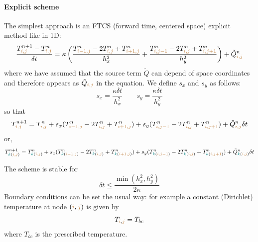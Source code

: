 \paragraph{Explicit scheme} The simplest approach is an {\color{olive} FTCS} 
(forward time, centered space) explicit method like in 1D:
\begin{equation}
\frac{T_{{\color{brown}i,j}}^{n+1}-T_{{\color{brown}i,j}}^n}{\delta t}
= \kappa
\left(
\frac{ T_{{\color{brown}i-1,j}}^{n}-2T_{{\color{brown}i,j}}^{n}+T_{{\color{brown}i+1,j}}^{n}  }{h_x^2} + 
\frac{ T_{{\color{brown}i,j-1}}^{n}-2T_{{\color{brown}i,j}}^{n}+T_{{\color{brown}i,j+1}}^{n}  }{h_y^2}
\right)
+\tilde{Q}_{{\color{brown}i,j}}^n
\end{equation}
where we have assumed that the source term $\tilde{Q}$ 
can depend of space coordinates and therefore 
appears as $\tilde{Q}_{{\color{brown}i,j}}$ in the equation.
We define $s_x$ and $s_y$ as follows:
\begin{equation}
s_x = \frac{\kappa \delta t}{h_x^2}
\quad\quad
s_y = \frac{\kappa \delta t}{h_y^2}
\end{equation}
so that
\begin{equation}
T_{{\color{brown}i,j}}^{n+1} = T_{{\color{brown}i,j}}^n 
+ s_x ( T_{{\color{brown}i-1,j}}^{n}
-2T_{{\color{brown}i,j}}^{n}
+T_{{\color{brown}i+1,j}}^{n} ) 
+s_y ( T_{{\color{brown}i,j-1}}^{n}
-2T_{{\color{brown}i,j}}^{n}
+T_{{\color{brown}i,j+1}}^{n} ) + 
\tilde{Q}_{{\color{brown}i,j}}^n \delta t
\end{equation}
or, 
\begin{equation}
T_{{\color{teal}k}({\color{brown}i,j})}^{n+1} = 
T_{{\color{teal}k}({\color{brown}i,j})}^n 
+ s_x ( T_{{\color{teal}k}({\color{brown}i-1,j})}^{n}
-2T_{{\color{teal}k}({\color{brown}i,j})}^{n}
+T_{{\color{teal}k}({\color{brown}i+1,j})}^{n} ) 
+s_y ( T_{{\color{teal}k}({\color{brown}i,j-1})}^{n}
-2T_{{\color{teal}k}({\color{brown}i,j})}^{n}
+T_{{\color{teal}k}({\color{brown}i,j+1})}^{n} ) + 
\tilde{Q}_{{\color{teal}k}({\color{brown}i,j})}^n \delta t
\end{equation}



The scheme is stable for  
\begin{equation}
\delta t \leq \frac{\min(h_x^2,h_y^2)}{2 \kappa}
\end{equation}
Boundary conditions can be set the usual way: for example a constant (Dirichlet) temperature 
at node $({\color{brown}i},{\color{brown}j})$ is given by
\begin{equation}
T_{{\color{brown}i},{\color{brown}j}}=T_{bc} 
\end{equation}
where $T_{bc}$ is the prescribed temperature. 

